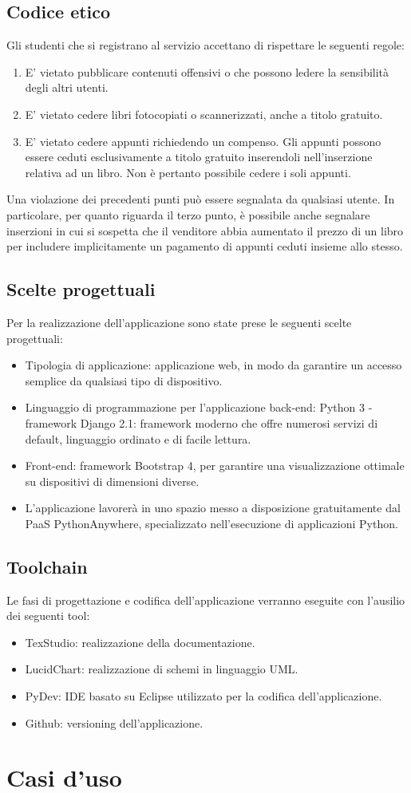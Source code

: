 \documentclass[10pt,a4paper]{book}
\begin{document}
	\subsection{Codice etico}
	Gli studenti che si registrano al servizio accettano di rispettare le seguenti regole:
	\begin{enumerate}
		\item E' vietato pubblicare contenuti offensivi o che possono ledere la sensibilità degli altri utenti.
		\item E' vietato cedere libri fotocopiati o scannerizzati, anche a titolo gratuito.
		\item E' vietato cedere appunti richiedendo un compenso. Gli appunti possono essere ceduti esclusivamente a titolo gratuito inserendoli nell'inserzione relativa ad un libro. Non è pertanto possibile cedere i soli appunti. 
	\end{enumerate}
	Una violazione dei precedenti punti può essere segnalata da qualsiasi utente. In particolare, per quanto riguarda il terzo punto, è possibile anche segnalare inserzioni in cui si sospetta che il venditore abbia aumentato il prezzo di un libro per includere implicitamente un pagamento di appunti ceduti insieme allo stesso.

	\subsection{Scelte progettuali}
	Per la realizzazione dell'applicazione sono state prese le seguenti scelte progettuali:
	\begin{itemize}
		\item Tipologia di applicazione: applicazione web, in modo da garantire un accesso semplice da qualsiasi tipo di dispositivo.
		\item Linguaggio di programmazione per l'applicazione back-end: Python 3 - framework Django 2.1: framework moderno che offre numerosi servizi di default, linguaggio ordinato e di facile lettura.
		\item Front-end: framework Bootstrap 4, per garantire una visualizzazione ottimale su dispositivi di dimensioni diverse.
		\item L'applicazione lavorerà in uno spazio messo a disposizione gratuitamente dal PaaS PythonAnywhere, specializzato nell'esecuzione di applicazioni Python.
	\end{itemize}

	\subsection{Toolchain}
	Le fasi di progettazione e codifica dell'applicazione verranno eseguite con l'ausilio dei seguenti tool:
	\begin{itemize}
		\item TexStudio: realizzazione della documentazione.
		\item LucidChart: realizzazione di schemi in linguaggio UML.
		\item PyDev: IDE basato su Eclipse utilizzato per la codifica dell'applicazione.
		\item Github: versioning dell'applicazione.
	\end{itemize}

	\section{Casi d'uso}
	
\end{document}

